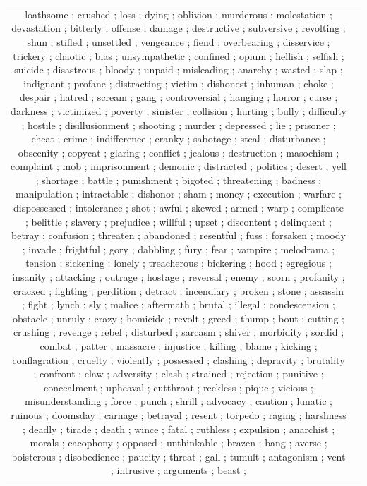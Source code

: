 \documentclass[11pt]{article}
\begin{document}
\begin{table}[th]
\begin{center}
\begin{tabular}{c @{\hspace{0pt}}  @{\hspace{15pt}}p{}}
loathsome	;
crushed	;
loss	;
dying	;
oblivion	;
murderous	;
molestation	;
devastation	;
bitterly	;
offense	;
damage	;
destructive	;
subversive	;
revolting	;
shun	;
stifled	;
unsettled	;
vengeance	;
fiend	;
overbearing	;
disservice	;
trickery	;
chaotic	;
bias	;
unsympathetic	;
confined	;
opium	;
hellish	;
selfish	;
suicide	;
disastrous	;
bloody	;
unpaid	;
misleading	;
anarchy	;
wasted	;
slap	;
indignant	;
profane	;
distracting	;
victim	;
dishonest	;
inhuman	;
choke	;
despair	;
hatred	;
scream	;
gang	;
controversial	;
hanging	;
horror	;
curse	;
darkness	;
victimized	;
poverty	;
sinister	;
collision	;
hurting	;
bully	;
difficulty	;
hostile	;
disillusionment	;
shooting	;
murder	;
depressed	;
lie	;
prisoner	;
cheat	;
crime	;
indifference	;
cranky	;
sabotage	;
steal	;
disturbance	;
obscenity	;
copycat	;
glaring	;
conflict	;
jealous	;
destruction	;
masochism	;
complaint	;
mob	;
imprisonment	;
demonic	;
distracted	;
politics	;
desert	;
yell	;
shortage	;
battle	;
punishment	;
bigoted	;
threatening	;
badness	;
manipulation	;
intractable	;
dishonor	;
sham	;
money	;
execution	;
warfare	;
dispossessed	;
intolerance	;
shot	;
awful	;
skewed	;
armed	;
warp	;
complicate	;
belittle	;
slavery	;
prejudice	;
willful	;
upset	;
discontent	;
delinquent	;
betray	;
confusion	;
threaten	;
abandoned	;
resentful	;
fuss	;
forsaken	;
moody	;
invade	;
frightful	;
gory	;
dabbling	;
fury	;
fear	;
vampire	;
melodrama	;
tension	;
sickening	;
lonely	;
treacherous	;
bickering	;
hood	;
egregious	;
insanity	;
attacking	;
outrage	;
hostage	;
reversal	;
enemy	;
scorn	;
profanity	;
cracked	;
fighting	;
perdition	;
detract	;
incendiary	;
broken	;
stone	;
assassin	;
fight	;
lynch	;
sly	;
malice	;
aftermath	;
brutal	;
illegal	;
condescension	;
obstacle	;
unruly	;
crazy	;
homicide	;
revolt	;
greed	;
thump	;
bout	;
cutting	;
crushing	;
revenge	;
rebel	;
disturbed	;
sarcasm	;
shiver	;
morbidity	;
sordid	;
combat	;
patter	;
massacre	;
injustice	;
killing	;
blame	;
kicking	;
conflagration	;
cruelty	;
violently	;
possessed	;
clashing	;
depravity	;
brutality	;
confront	;
claw	;
adversity	;
clash	;
strained	;
rejection	;
punitive	;
concealment	;
upheaval	;
cutthroat	;
reckless	;
pique	;
vicious	;
misunderstanding	;
force	;
punch	;
shrill	;
advocacy	;
caution	;
lunatic	;
ruinous	;
doomsday	;
carnage	;
betrayal	;
resent	;
torpedo	;
raging	;
harshness	;
deadly	;
tirade	;
death	;
wince	;
fatal	;
ruthless	;
expulsion	;
anarchist	;
morals	;
cacophony	;
opposed	;
unthinkable	;
brazen	;
bang	;
averse	;
boisterous	;
disobedience	;
paucity	;
threat	;
gall	;
tumult	;
antagonism	;
vent	;
intrusive	;
arguments	;
beast	;

\end{tabular}
\end{center}
\end{table}
\end{document}
